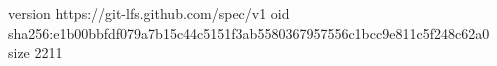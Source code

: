version https://git-lfs.github.com/spec/v1
oid sha256:e1b00bbfdf079a7b15c44c5151f3ab5580367957556c1bcc9e811c5f248c62a0
size 2211
